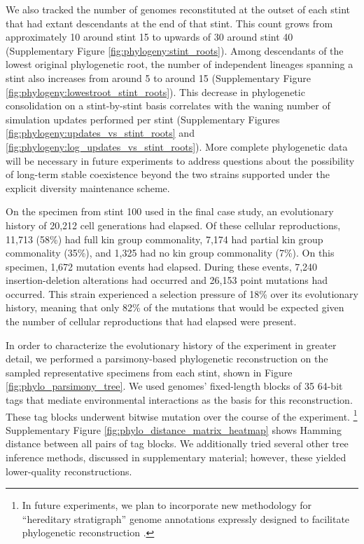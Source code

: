 We also tracked the number of genomes reconstituted at the outset of each stint that had extant descendants at the end of that stint.
This count grows from approximately 10 around stint 15 to upwards of 30 around stint 40 (Supplementary Figure \ref{fig:phylogeny:stint_roots}).
Among descendants of the lowest original phylogenetic root, the number of independent lineages spanning a stint also increases from around 5 to around 15
(Supplementary Figure \ref{fig:phylogeny:lowestroot_stint_roots}).
This decrease in phylogenetic consolidation on a stint-by-stint basis correlates with the waning number of simulation updates performed per stint (Supplementary Figures \ref{fig:phylogeny:updates_vs_stint_roots} and \ref{fig:phylogeny:log_updates_vs_stint_roots}).
More complete phylogenetic data will be necessary in future experiments to address questions about the possibility of long-term stable coexistence beyond the two strains supported under the explicit diversity maintenance scheme.

On the specimen from stint 100 used in the final case study, an evolutionary history of 20,212 cell generations had elapsed.
Of these cellular reproductions, 11,713 (58\%) had full kin group commonality, 7,174 had partial kin group commonality (35\%), and 1,325 had no kin group commonality (7\%).
On this specimen, 1,672 mutation events had elapsed.
During these events, 7,240 insertion-deletion alterations had occurred and 26,153 point mutations had occurred.
This strain experienced a selection pressure of 18\% over its evolutionary history, meaning that only 82\% of the mutations that would be expected given the number of cellular reproductions that had elapsed were present.



In order to characterize the evolutionary history of the experiment in greater detail, we performed a parsimony-based phylogenetic reconstruction on the sampled representative specimens from each stint, shown in Figure \ref{fig:phylo_parsimony_tree}.
We used genomes' fixed-length blocks of 35 64-bit tags that mediate environmental interactions as the basis for this reconstruction.
These tag blocks underwent bitwise mutation over the course of the experiment.%
\footnote{
In future experiments, we plan to incorporate new methodology for ``hereditary stratigraph'' genome annotations expressly designed to facilitate phylogenetic reconstruction .
}
Supplementary Figure \ref{fig:phylo_distance_matrix_heatmap} shows Hamming distance between all pairs of tag blocks.
We additionally tried several other tree inference methods, discussed in supplementary material; however, these yielded lower-quality reconstructions.

